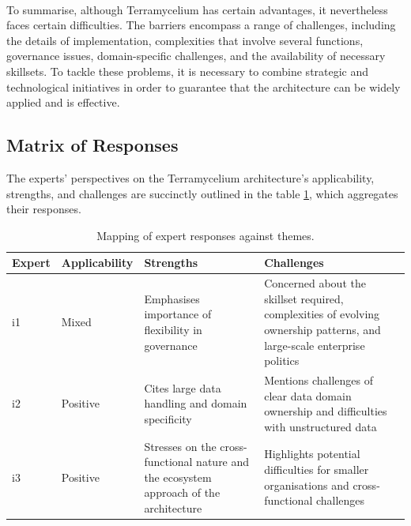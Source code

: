 \documentclass[review]{elsarticle}
\begin{document}
\,

To summarise, although Terramycelium has certain advantages, it nevertheless faces certain difficulties. The barriers encompass a range of challenges, including the details of implementation, complexities that involve several functions, governance issues, domain-specific challenges, and the availability of necessary skillsets. To tackle these problems, it is necessary to combine strategic and technological initiatives in order to guarantee that the architecture can be widely applied and is effective.

\subsection{Matrix of Responses} \label{expertOpinion_matrixResponses}

The experts' perspectives on the Terramycelium architecture's applicability, strengths, and challenges are succinctly outlined in the table \ref{tab:responses}, which aggregates their responses.

\begin{table}[ht]

  \centering

  \caption{Mapping of expert responses against themes.}

  \begin{tabular}{@{}llp{}p{}@{}}

  \hline

  Expert & Applicability & Strengths & Challenges \\

  \hline

  i1 & Mixed & Emphasises importance of flexibility in governance & Concerned about the skillset required, complexities of evolving ownership patterns, and large-scale enterprise politics \\

  i2 & Positive & Cites large data handling and domain specificity & Mentions challenges of clear data domain ownership and difficulties with unstructured data \\

  i3 & Positive & Stresses on the cross-functional nature and the ecosystem approach of the architecture & Highlights potential difficulties for smaller organisations and cross-functional challenges \\

  \hline

  \end{tabular}

  \label{tab:responses}

\end{table}
\end{document}

